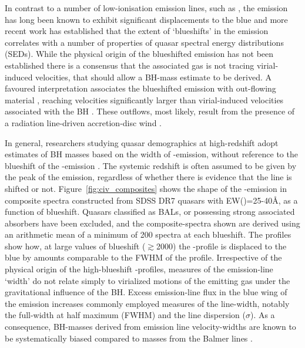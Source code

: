 In contrast to a number of low-ionisation emission lines, such as , the  emission has long been known to exhibit significant displacements to the blue \citep{gaskell82} and more recent work \citep[e.g.][]{sulentic00a, richards11} has established that the extent of `blueshifts' in the  emission correlates with a number of properties of quasar spectral energy distributions (SEDs). 
While the physical origin of the blueshifted emission has not been established there is a consensus that the associated gas is not tracing virial-induced velocities, that should allow a BH-mass estimate to be derived.  
A favoured interpretation associates the blueshifted emission with out-flowing material \citep[see][for a recent review]{netzer15}, reaching velocities significantly larger than virial-induced velocities associated with the BH \citep[e.g.][]{sulentic07, richards11}.
These outflows, most likely, result from the presence of a radiation line-driven accretion-disc wind \citep[e.g.][]{konigl94, murray95, proga00, everett05, gallagher15,higginbottom15}.  

In general, researchers studying quasar demographics at high-redshift adopt estimates of BH masses based on the width of -emission, without reference to the blueshift of the -emission \citep[e.g.][]{vestergaard04,kollmeier06,gavignaud08,vestergaard08,vestergaard09,kelly10,kelly13}.  
The systemic redshift is often assumed to be given by the peak of the  emission, regardless of whether there is evidence that the line is shifted or not.
Figure~\ref{fig:civ_composites} shows the shape of the -emission in composite spectra constructed from SDSS DR7 quasars with EW()=25-40\AA, as a function of  blueshift. 
Quasars classified as BALs, or possessing strong associated absorbers have been excluded, and the composite-spectra shown are derived using an arithmetic mean of a minimum of 200 spectra at each blueshift. 
The profiles show how, at large values of blueshift ($\gtrsim$2000\kms) the -profile is displaced to the blue by amounts comparable to the FWHM of the profile.
Irrespective of the physical origin of the high-blueshift -profiles, measures of the emission-line `width' do not relate simply to virialized motions of the emitting gas under the gravitational influence of the BH. 
Excess emission-line flux in the blue wing of the  emission increases commonly employed measures of the line-width, notably the full-width at half maximum (FWHM) and the line dispersion ($\sigma$). 
As a consequence, BH-masses derived from  emission line velocity-widths are known to be systematically biased compared to masses from the Balmer lines \citep[e.g.][]{shen08,shen12}. 

